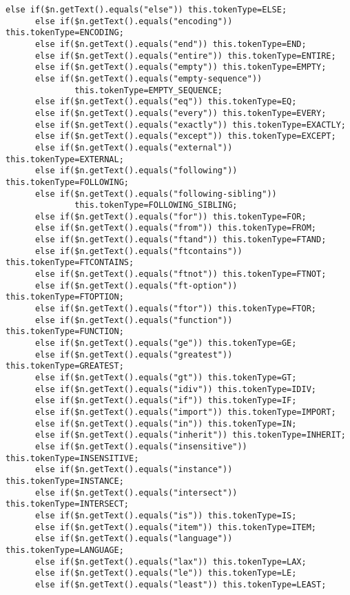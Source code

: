 \begin{Verbatim}[frame=none, fontsize=\footnotesize]
      else if($n.getText().equals("else")) this.tokenType=ELSE;
      else if($n.getText().equals("encoding")) this.tokenType=ENCODING;
      else if($n.getText().equals("end")) this.tokenType=END;
      else if($n.getText().equals("entire")) this.tokenType=ENTIRE;
      else if($n.getText().equals("empty")) this.tokenType=EMPTY;
      else if($n.getText().equals("empty-sequence")) 
              this.tokenType=EMPTY_SEQUENCE;
      else if($n.getText().equals("eq")) this.tokenType=EQ;
      else if($n.getText().equals("every")) this.tokenType=EVERY;
      else if($n.getText().equals("exactly")) this.tokenType=EXACTLY;
      else if($n.getText().equals("except")) this.tokenType=EXCEPT;
      else if($n.getText().equals("external")) this.tokenType=EXTERNAL;
      else if($n.getText().equals("following")) this.tokenType=FOLLOWING;
      else if($n.getText().equals("following-sibling")) 
              this.tokenType=FOLLOWING_SIBLING;
      else if($n.getText().equals("for")) this.tokenType=FOR;
      else if($n.getText().equals("from")) this.tokenType=FROM;
      else if($n.getText().equals("ftand")) this.tokenType=FTAND;
      else if($n.getText().equals("ftcontains")) this.tokenType=FTCONTAINS;
      else if($n.getText().equals("ftnot")) this.tokenType=FTNOT;
      else if($n.getText().equals("ft-option")) this.tokenType=FTOPTION;
      else if($n.getText().equals("ftor")) this.tokenType=FTOR;
      else if($n.getText().equals("function")) this.tokenType=FUNCTION;
      else if($n.getText().equals("ge")) this.tokenType=GE;
      else if($n.getText().equals("greatest")) this.tokenType=GREATEST;
      else if($n.getText().equals("gt")) this.tokenType=GT;
      else if($n.getText().equals("idiv")) this.tokenType=IDIV;
      else if($n.getText().equals("if")) this.tokenType=IF;
      else if($n.getText().equals("import")) this.tokenType=IMPORT;
      else if($n.getText().equals("in")) this.tokenType=IN;
      else if($n.getText().equals("inherit")) this.tokenType=INHERIT;
      else if($n.getText().equals("insensitive")) this.tokenType=INSENSITIVE;
      else if($n.getText().equals("instance")) this.tokenType=INSTANCE;
      else if($n.getText().equals("intersect")) this.tokenType=INTERSECT;
      else if($n.getText().equals("is")) this.tokenType=IS;
      else if($n.getText().equals("item")) this.tokenType=ITEM;
      else if($n.getText().equals("language")) this.tokenType=LANGUAGE;
      else if($n.getText().equals("lax")) this.tokenType=LAX;
      else if($n.getText().equals("le")) this.tokenType=LE;
      else if($n.getText().equals("least")) this.tokenType=LEAST;

\end{Verbatim}
